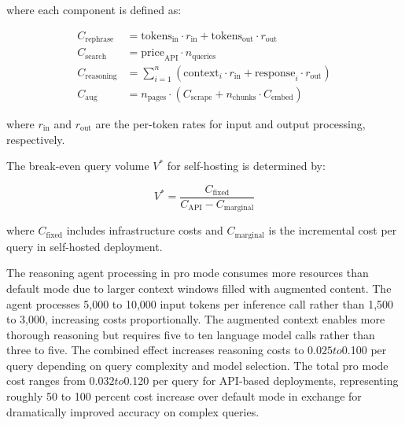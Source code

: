 where each component is defined as:

\begin{align}
C_{\text{rephrase}} &= \text{tokens}_{\text{in}} \cdot r_{\text{in}} + \text{tokens}_{\text{out}} \cdot r_{\text{out}} \label{eq:cost_rephrase} \\
C_{\text{search}} &= \text{price}_{\text{API}} \cdot n_{\text{queries}} \label{eq:cost_search} \\
C_{\text{reasoning}} &= \sum_{i=1}^{n} \left(\text{context}_i \cdot r_{\text{in}} + \text{response}_i \cdot r_{\text{out}}\right) \label{eq:cost_reasoning} \\
C_{\text{aug}} &= n_{\text{pages}} \cdot \left(C_{\text{scrape}} + n_{\text{chunks}} \cdot C_{\text{embed}}\right) \label{eq:cost_augmentation}
\end{align}

where $r_{\text{in}}$ and $r_{\text{out}}$ are the per-token rates for input and output processing, respectively.

The break-even query volume $V^*$ for self-hosting is determined by:

\begin{equation}
V^* = \frac{C_{\text{fixed}}}{C_{\text{API}} - C_{\text{marginal}}}
\label{eq:breakeven}
\end{equation}

where $C_{\text{fixed}}$ includes infrastructure costs and $C_{\text{marginal}}$ is the incremental cost per query in self-hosted deployment.

The reasoning agent processing in pro mode consumes more resources than default mode due to larger context windows filled with augmented content. The agent processes 5,000 to 10,000 input tokens per inference call rather than 1,500 to 3,000, increasing costs proportionally. The augmented context enables more thorough reasoning but requires five to ten language model calls rather than three to five. The combined effect increases reasoning costs to $0.025 to $0.100 per query depending on query complexity and model selection. The total pro mode cost ranges from $0.032 to $0.120 per query for API-based deployments, representing roughly 50 to 100 percent cost increase over default mode in exchange for dramatically improved accuracy on complex queries.

